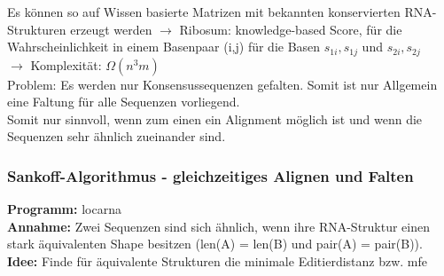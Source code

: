 Es können so auf Wissen basierte Matrizen mit bekannten konservierten RNA-Strukturen erzeugt werden
$\rightarrow$ Ribosum: knowledge-based Score, für die Wahrscheinlichkeit in einem Basenpaar (i,j) für die Basen $s_{1i}, s_{1j}$ und $s_{2i}, s_{2j}$ \\

$\rightarrow$ Komplexität: $\Omega(n^{3}m)$ \\

Problem: Es werden nur Konsensussequenzen gefalten. Somit ist nur Allgemein eine Faltung für alle Sequenzen vorliegend. \\
Somit nur sinnvoll, wenn zum einen ein Alignment möglich ist und wenn die Sequenzen sehr ähnlich zueinander sind.

\subsubsection{Sankoff-Algorithmus - gleichzeitiges Alignen und Falten}

\textbf{Programm:} locarna \\

\textbf{Annahme:} Zwei Sequenzen sind sich ähnlich, wenn ihre RNA-Struktur einen stark äquivalenten Shape besitzen (len(A) = len(B) und pair(A) = pair(B)).\\

\textbf{Idee:} Finde für äquivalente Strukturen die minimale Editierdistanz  bzw. mfe \\

